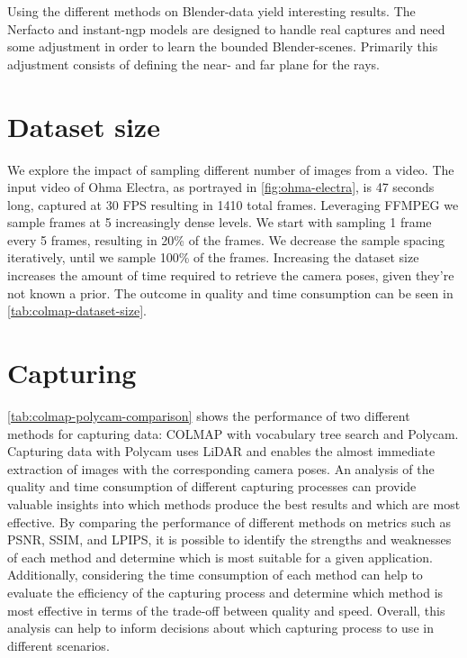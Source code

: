 Using the different methods on Blender-data yield interesting results. The Nerfacto and instant-ngp models are designed to handle real captures and need some adjustment in order to learn the bounded Blender-scenes. Primarily this adjustment consists of defining the near- and far plane for the rays.



\section{Dataset size}
We explore the impact of sampling different number of images from a video. The input video of Ohma Electra, as portrayed in \autoref{fig:ohma-electra}, is 47 seconds long, captured at 30 FPS resulting in 1410 total frames. Leveraging FFMPEG we sample frames at 5 increasingly dense levels. We start with sampling 1 frame every 5 frames, resulting in 20\% of the frames. We decrease the sample spacing iteratively, until we sample 100\% of the frames. Increasing the dataset size increases the amount of time required to retrieve the camera poses, given they're not known a prior. The outcome in quality and time consumption can be seen in \autoref{tab:colmap-dataset-size}.




\section{Capturing}
\autoref{tab:colmap-polycam-comparison} shows the performance of two different methods for capturing data: COLMAP with vocabulary tree search and Polycam. Capturing data with Polycam uses LiDAR and enables the almost immediate extraction of images with the corresponding camera poses. An analysis of the quality and time consumption of different capturing processes can provide valuable insights into which methods produce the best results and which are most effective. By comparing the performance of different methods on metrics such as PSNR, SSIM, and LPIPS, it is possible to identify the strengths and weaknesses of each method and determine which is most suitable for a given application. Additionally, considering the time consumption of each method can help to evaluate the efficiency of the capturing process and determine which method is most effective in terms of the trade-off between quality and speed. Overall, this analysis can help to inform decisions about which capturing process to use in different scenarios.

